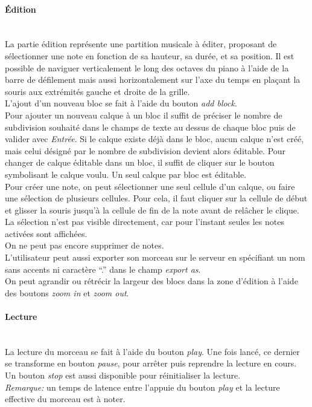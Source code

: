 \documentclass[12pt,a4paper]{article}
\begin{document}
\paragraph{Édition}~\\
La partie édition représente une partition musicale à éditer, proposant de sélectionner une note en fonction de sa hauteur, sa durée, et sa position. Il est possible de naviguer verticalement le long des octaves du piano à l’aide de la barre de défilement mais aussi horizontalement sur l’axe du temps en plaçant la souris aux extrémités gauche et droite de la grille.\\
L’ajout d’un nouveau bloc se fait à l’aide du bouton \emph{add block}.\\
Pour ajouter un nouveau calque à un bloc il suffit de préciser le nombre de subdivision souhaité dans le champs de texte au dessus de chaque bloc puis de valider avec \emph{Entrée}. Si le calque existe déjà dans le bloc, aucun calque n’est créé, mais celui désigné par le nombre de subdivision devient alors éditable. Pour changer de calque éditable dans un bloc, il suffit de cliquer sur le bouton symbolisant le calque voulu. Un seul calque par bloc est éditable.\\
Pour créer une note, on peut sélectionner une seul cellule d’un calque, ou faire une sélection de plusieurs cellules. Pour cela, il faut cliquer sur la cellule de début et glisser la souris jusqu’à la cellule de fin de la note avant de relâcher le clique. La sélection n’est pas visible directement, car pour l’instant seules les notes activées sont affichées.\\
On ne peut pas encore supprimer de notes.\\
L'utilisateur peut aussi exporter son morceau sur le serveur en spécifiant un nom sans accents ni caractère “.” dans le champ \emph{export as}.\\
On peut agrandir ou rétrécir la largeur des blocs dans la zone d'édition à l’aide des boutons \emph{zoom in} et \emph{zoom out}.

\paragraph{Lecture}~\\
La lecture du morceau se fait à l’aide du bouton \emph{play}. Une fois lancé, ce dernier se transforme en bouton \emph{pause}, pour arrêter puis reprendre la lecture en cours. Un bouton \emph{stop} est aussi disponible pour réinitialiser la lecture.\\
\emph{Remarque:} un temps de latence entre l’appuie du bouton \emph{play} et la lecture effective du morceau est à noter.
\end{document}
